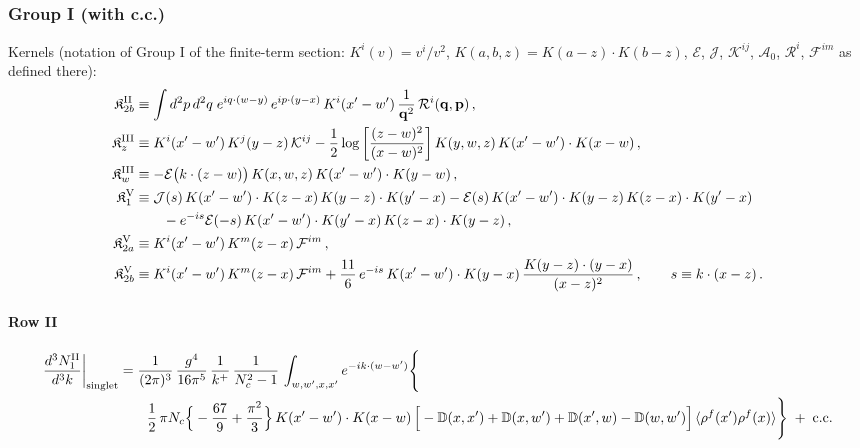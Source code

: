 \documentclass[10pt]{article}
\def\mf#1{\mathbb{#1}}
\begin{document}
\subsubsection{Group I (with c.c.)}
\noindent Kernels (notation of Group I of the finite-term section: $K^{i}(v)=v^{i}/v^{2}$, $K(a,b,z)=K(a-z)\cdot K(b-z)$, $\mathcal{E}$, $\mathcal{J}$, $\mathcal{K}^{ij}$, $\mathcal{A}_{0}$, $\mathcal{R}^{i}$, $\mathcal{F}^{im}$ as defined there):
\begin{align}
\mathfrak{K}^{\rm II}_{2b}&\equiv\int d^{2}p\,d^{2}q\;e^{iq\cdot(w-y)}\,e^{ip\cdot(y-x)}\,K^{i}(x'-w')\,\frac{1}{\mathbf{q}^{2}}\,\mathcal{R}^{i}(\mathbf{q},\mathbf{p})\,,\notag\\
\mathfrak{K}^{\rm III}_{z}&\equiv K^{i}(x'-w')\,K^{j}(y-z)\,\mathcal{K}^{ij}-\frac12\log\left[\frac{(z-w)^{2}}{(x-w)^{2}}\right]K(y,w,z)\,K(x'-w')\cdot K(x-w)\,,\notag\\
\mathfrak{K}^{\rm III}_{w}&\equiv-\mathcal{E}\big(k\cdot(z-w)\big)\,K(x,w,z)\,K(x'-w')\cdot K(y-w)\,,\notag\\
\mathfrak{K}^{\rm V}_{1}&\equiv\mathcal{J}(s)\,K(x'-w')\cdot K(z-x)\,K(y-z)\cdot K(y'-x)-\mathcal{E}(s)\,K(x'-w')\cdot K(y-z)\,K(z-x)\cdot K(y'-x)\notag\\&\qquad-e^{-is}\mathcal{E}(-s)\,K(x'-w')\cdot K(y'-x)\,K(z-x)\cdot K(y-z)\,,\notag\\
\mathfrak{K}^{\rm V}_{2a}&\equiv K^{i}(x'-w')\,K^{m}(z-x)\,\mathcal{F}^{im}\,,\notag\\
\mathfrak{K}^{\rm V}_{2b}&\equiv K^{i}(x'-w')\,K^{m}(z-x)\,\mathcal{F}^{im}+\frac{11}{6}\,e^{-is}\,K(x'-w')\cdot K(y-x)\,\frac{K(y-z)\cdot(y-x)}{(x-z)^{2}}\,,\qquad s\equiv k\cdot(x-z)\,.\notag
\end{align}

\paragraph*{Row II}

\begin{align}
\frac{d^{3}N_{1}^{\rm II}}{d^{3}k}\bigg|_{\rm singlet}&=\frac{1}{(2\pi)^{3}}\,\frac{g^{4}}{16\pi^{5}}\,\frac{1}{k^{+}}\,\frac{1}{N_{c}^{2}-1}\,\int_{w,w',x,x'}e^{-ik\cdot(w-w')}\Bigg\{\notag\\
&\qquad \frac{1}{2}\,\pi N_{c}\Big\{-\frac{67}{9}+\frac{\pi^{2}}{3}\Big\}\,K(x'-w')\cdot K(x-w)\,\Big[-\mf{D}(x,x')+\mf{D}(x,w')+\mf{D}(x',w)-\mf{D}(w,w')\Big]\,\langle\rho^{f}(x')\rho^{f}(x)\rangle\Bigg\}\;+\;{\rm c.c.}\label{eq:s-I-II-1}
\end{align}
\end{document}
